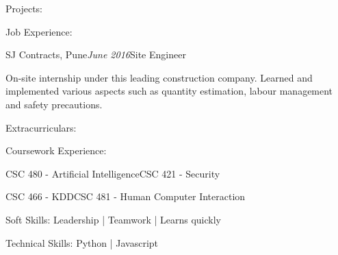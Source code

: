 \documentclass{resume3}%
\begin{document}
\begin{flushleft}
\begin{rSection}{Projects:}
\end{rSection}%
\begin{rSection}{Job Experience:}%
\begin{rSubsection}{SJ Contracts, Pune}{\textit{June 2016}}{Site Engineer}{}%
\item{On{-}site internship under this leading construction company. Learned and implemented various aspects such as quantity estimation, labour management and safety precautions.}%
\end{rSubsection}%
\end{rSection}%
\begin{rSection}{Extracurriculars:}%
%
%
\end{rSection}%
\begin{rSection}{Coursework Experience:}%
%
\item{CSC 480 {-} Artificial Intelligence}{CSC 421 {-} Security}%
\item{CSC 466 {-} KDD}{CSC 481 {-} Human Computer Interaction}%
\end{rSection}%
\begin{rSection}{Soft Skills:}%
Leadership |  Teamwork |  Learns quickly%
\end{rSection}%
\begin{rSection}{Technical Skills:}%
Python |  Javascript%
\end{rSection}%
\end{flushleft}%
\end{document}
